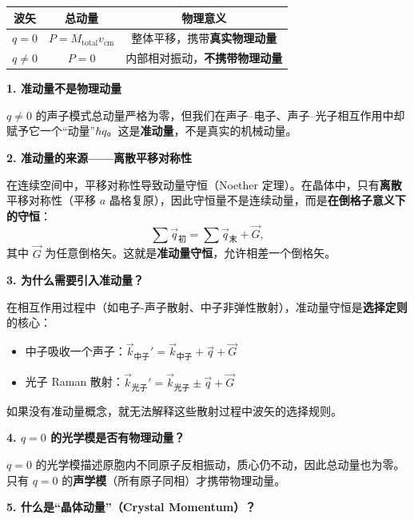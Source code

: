 \begin{formulabox}[结果汇总]
\begin{center}
\begin{tabular}{ccc}
\toprule
波矢 & 总动量 & 物理意义 \\
\midrule
$q=0$ & $P=M_{\text{total}}v_{\text{cm}}$ & 整体平移，携带\textbf{真实物理动量} \\
$q\neq0$ & $P=0$ & 内部相对振动，\textbf{不携带物理动量} \\
\bottomrule
\end{tabular}
\end{center}
\end{formulabox}

\begin{insightbox}
\textbf{1. 准动量不是物理动量}

$q\neq0$ 的声子模式总动量严格为零，但我们在声子--电子、声子--光子相互作用中却赋予它一个``动量''$\hbar q$。这是\textbf{准动量}，不是真实的机械动量。

\textbf{2. 准动量的来源——离散平移对称性}

在连续空间中，平移对称性导致动量守恒（Noether 定理）。在晶体中，只有\textbf{离散}平移对称性（平移 $a$ 晶格复原），因此守恒量不是连续动量，而是\textbf{在倒格子意义下的守恒}：
\begin{equation}
\sum \vec q_{\text{初}} = \sum \vec q_{\text{末}} + \vec G,
\end{equation}
其中 $\vec G$ 为任意倒格矢。这就是\textbf{准动量守恒}，允许相差一个倒格矢。

\textbf{3. 为什么需要引入准动量？}

在相互作用过程中（如电子-声子散射、中子非弹性散射），准动量守恒是\textbf{选择定则}的核心：
\begin{itemize}
    \item 中子吸收一个声子：$\vec k_{\text{中子}}' = \vec k_{\text{中子}} + \vec q + \vec G$
    \item 光子 Raman 散射：$\vec k_{\text{光子}}' = \vec k_{\text{光子}} \pm \vec q + \vec G$
\end{itemize}
如果没有准动量概念，就无法解释这些散射过程中波矢的选择规则。

\textbf{4. $q=0$ 的光学模是否有物理动量？}

$q=0$ 的光学模描述原胞内不同原子反相振动，质心仍不动，因此总动量也为零。只有 $q=0$ 的\textbf{声学模}（所有原子同相）才携带物理动量。

\textbf{5. 什么是``晶体动量''（Crystal Momentum）？}


\end{insightbox}

